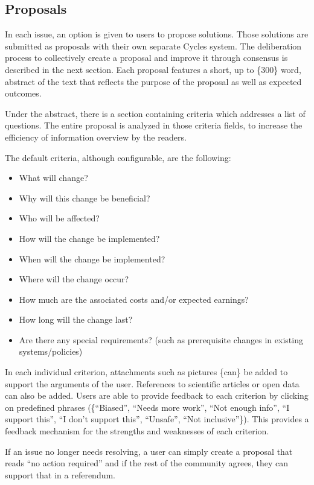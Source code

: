 \documentclass[a4paper,11pt]{article}
\begin{document}
\begin{multicols}{2}
\subsection{Proposals} \label{proposals}

In each issue, an option is given to users to propose solutions. Those solutions are submitted as proposals with their own separate Cycles system. The deliberation process to collectively create a proposal and improve it through consensus is described in the next section. Each proposal features a short, up to \{300\} word, abstract of the text that reflects the purpose of the proposal as well as expected outcomes.

Under the abstract, there is a section containing criteria which addresses a list of questions. The entire proposal is analyzed in those criteria fields, to increase the efficiency of information overview by the readers.

The default criteria, although configurable, are the following:

\begin{itemize}
\item What will change?
\item Why will this change be beneficial?
\item Who will be affected?
\item How will the change be implemented?
\item When will the change be implemented?
\item Where will the change occur?
\item How much are the associated costs and/or expected earnings?
\item How long will the change last?
\item Are there any special requirements? (such as prerequisite changes in existing systems/policies)
\end{itemize}

In each individual criterion, attachments such as pictures \{can\} be added to support the arguments of the user. References to scientific articles or open data can also be added. Users are able to provide feedback to each criterion by clicking on predefined phrases (\{“Biased”, “Needs more work”, “Not enough info”, “I support this”, “I don't support this”, “Unsafe”, “Not inclusive”\}). This provides a feedback mechanism for the strengths and weaknesses of each criterion.

If an issue no longer needs resolving, a user can simply create a proposal that reads “no action required” and if the rest of the community agrees, they can support that in a referendum.


\end{multicols}
\end{document}
